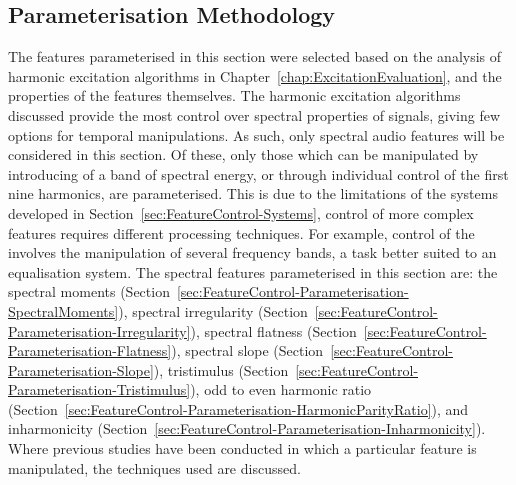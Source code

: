 	\subsection{Parameterisation Methodology}
	\label{sec:FeatureControl-Parameterisation-Methodology}
		The features parameterised in this section were selected based on the analysis of harmonic excitation
		algorithms in Chapter~\ref{chap:ExcitationEvaluation}, and the properties of the features themselves. The
		harmonic excitation algorithms discussed provide the most control over spectral properties of signals,
		giving few options for temporal manipulations. As such, only spectral audio features will be considered in
		this section. Of these, only those which can be manipulated by introducing of a band of spectral energy, or
		through individual control of the first nine harmonics, are parameterised. This is due to the limitations
		of the systems developed in Section~\ref{sec:FeatureControl-Systems}, control of more complex features
		requires different processing techniques. For example, control of the  involves the
		manipulation of several frequency bands, a task better suited to an equalisation system. The spectral
		features parameterised in this section are: the spectral moments
		(Section~\ref{sec:FeatureControl-Parameterisation-SpectralMoments}), spectral irregularity
		(Section~\ref{sec:FeatureControl-Parameterisation-Irregularity}), spectral flatness
		(Section~\ref{sec:FeatureControl-Parameterisation-Flatness}), spectral slope
		(Section~\ref{sec:FeatureControl-Parameterisation-Slope}), tristimulus
		(Section~\ref{sec:FeatureControl-Parameterisation-Tristimulus}), odd to even harmonic ratio
		(Section~\ref{sec:FeatureControl-Parameterisation-HarmonicParityRatio}), and inharmonicity
		(Section~\ref{sec:FeatureControl-Parameterisation-Inharmonicity}). Where previous studies have been
		conducted in which a particular feature is manipulated, the techniques used are discussed.

